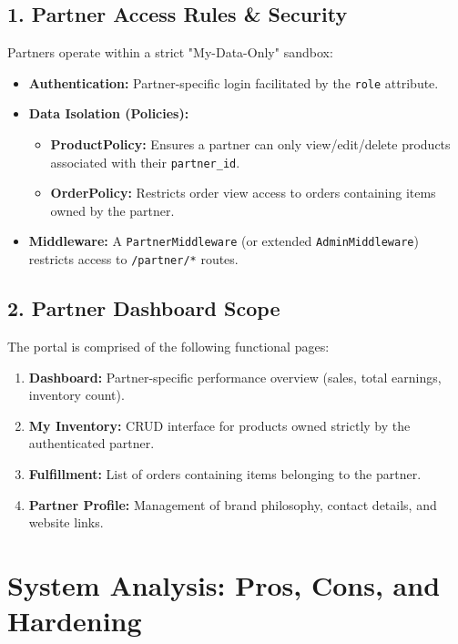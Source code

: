 \documentclass[12pt,a4paper]{article}
\begin{document}
\subsection{1. Partner Access Rules \& Security}
Partners operate within a strict "My-Data-Only" sandbox:
\begin{itemize}
    \item \textbf{Authentication:} Partner-specific login facilitated by the \texttt{role} attribute.
    \item \textbf{Data Isolation (Policies):}
    \begin{itemize}
        \item \textbf{ProductPolicy:} Ensures a partner can only view/edit/delete products associated with their \texttt{partner\_id}.
        \item \textbf{OrderPolicy:} Restricts order view access to orders containing items owned by the partner.
    \end{itemize}
    \item \textbf{Middleware:} A \texttt{PartnerMiddleware} (or extended \texttt{AdminMiddleware}) restricts access to \texttt{/partner/*} routes.
\end{itemize}

\subsection{2. Partner Dashboard Scope}
The portal is comprised of the following functional pages:
\begin{enumerate}
    \item \textbf{Dashboard:} Partner-specific performance overview (sales, total earnings, inventory count).
    \item \textbf{My Inventory:} CRUD interface for products owned strictly by the authenticated partner.
    \item \textbf{Fulfillment:} List of orders containing items belonging to the partner.
    \item \textbf{Partner Profile:} Management of brand philosophy, contact details, and website links.
\end{enumerate}

\section{System Analysis: Pros, Cons, and Hardening}
\end{document}
